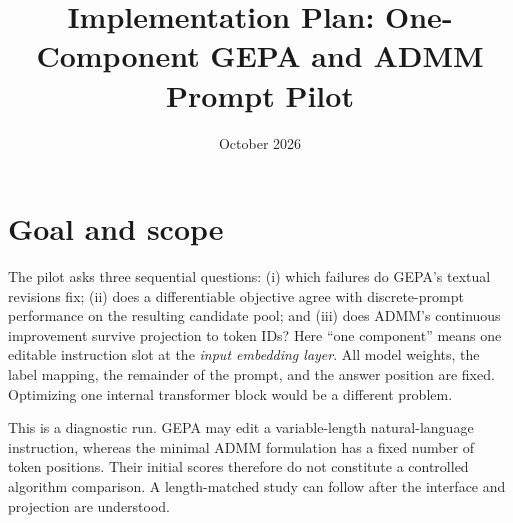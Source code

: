 \documentclass[11pt]{article}
\title{Implementation Plan: One-Component GEPA and ADMM Prompt Pilot}
\author{}
\date{October 2026}
\begin{document}
\maketitle
\vspace{-2.3em}

\section{Goal and scope}
The pilot asks three sequential questions: (i) which failures do GEPA's textual revisions fix; (ii) does a differentiable objective agree with discrete-prompt performance on the resulting candidate pool; and (iii) does ADMM's continuous improvement survive projection to token IDs?  Here ``one component'' means one editable instruction slot at the \emph{input embedding layer}. All model weights, the label mapping, the remainder of the prompt, and the answer position are fixed. Optimizing one internal transformer block would be a different problem.

This is a diagnostic run. GEPA may edit a variable-length natural-language instruction, whereas the minimal ADMM formulation has a fixed number of token positions. Their initial scores therefore do not constitute a controlled algorithm comparison. A length-matched study can follow after the interface and projection are understood.
\end{document}
